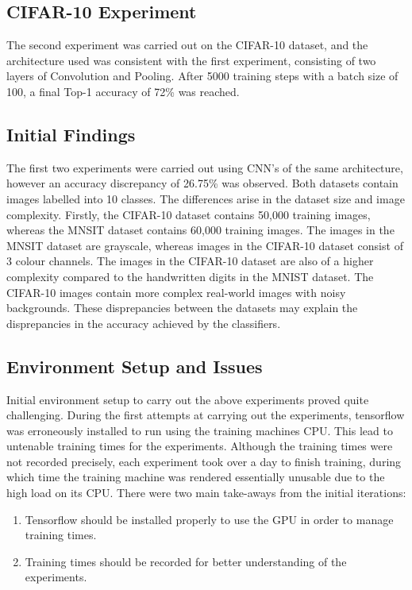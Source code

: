 \documentclass[12pt]{report}
\begin{document}
\newpage
\subsection{CIFAR-10 Experiment}

\begin{flushleft}
The second experiment was carried out on the CIFAR-10 dataset, and the architecture used was consistent with the first experiment, consisting of two layers of Convolution and Pooling. After 5000 training steps with a batch size of 100, a final Top-1 accuracy of 72\% was reached.
\end{flushleft}

\subsection{Initial Findings}

The first two experiments were carried out using CNN's of the same architecture, however an accuracy discrepancy of 26.75\% was observed. Both datasets contain images labelled into 10 classes. The differences arise in the dataset size and image complexity. Firstly, the CIFAR-10 dataset contains 50,000 training images, whereas the MNSIT dataset contains 60,000 training images. The images in the MNSIT dataset are grayscale, whereas images in the CIFAR-10 dataset consist of 3 colour channels. The images in the CIFAR-10 dataset are also of a higher complexity compared to the handwritten digits in the MNIST dataset. The CIFAR-10 images contain more complex real-world images with noisy backgrounds. These disprepancies between the datasets may explain the disprepancies in the accuracy achieved by the classifiers.

\subsection{Environment Setup and Issues}
\begin{flushleft}
Initial environment setup to carry out the above experiments proved quite challenging. During the first attempts at carrying out the experiments, tensorflow was erroneously installed to run using the training machines CPU. This lead to untenable training times for the experiments. Although the training times were not recorded precisely, each experiment took over a day to finish training, during which time the training machine was rendered essentially unusable due to the high load on its CPU. There were two main take-aways from the initial iterations:

\begin{enumerate}
  \item Tensorflow should be installed properly to use the GPU in order to manage training times.
  \item Training times should be recorded for better understanding of the experiments.
\end{enumerate}

\end{flushleft}
\end{document}
